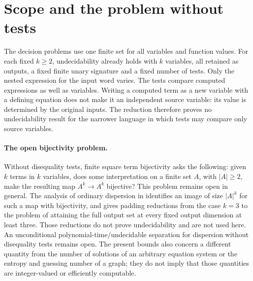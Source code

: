 \documentclass[12pt]{article}
\theoremstyle{definition}
\begin{document}
\section{Scope and the problem without tests}\label{sec:open}
The decision problems use one finite set for all variables and function values.
For each fixed $k\ge2$, undecidability already holds with $k$ variables,
all retained as outputs, a fixed finite unary signature and a fixed
number of tests. Only the nested expression for the input word varies.
The tests compare computed expressions as well as variables.
Writing a computed term as a new variable with a defining equation does
not make it an independent source variable: its value is determined
by the original inputs. The reduction therefore proves no
undecidability result for the narrower language in which tests may
compare only source variables.

\paragraph{The open bijectivity problem.}
Without disequality tests, finite square term bijectivity asks the
following: given $k$ terms in $k$ variables, does some interpretation
on a finite set $A$, with $|A|\ge2$, make the resulting map
$A^k\to A^k$ bijective? This problem remains open in general.
The analysis of ordinary dispersion in \cite{Paper2} identifies an image
of size $|A|^k$ for such a map with bijectivity, and gives padding
reductions from the case $k=3$
to the problem of attaining the full output set at every fixed output
dimension at least three. Those reductions do not prove undecidability
and are not used here. An unconditional polynomial-time/undecidable
separation for dispersion without disequality tests remains open.
The present bounds also concern a different quantity from the number
of solutions of an arbitrary equation system or the entropy and
guessing number of a graph; they do not imply that those quantities
are integer-valued or efficiently computable.
\end{document}
